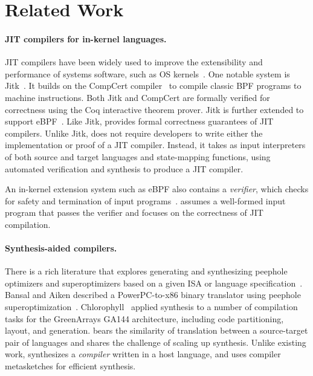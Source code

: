 \section{Related Work}\label{jitsynth:s:related}


\paragraph{JIT compilers for in-kernel languages.}

JIT compilers have been widely used to improve
the extensibility and performance of systems software,
such as OS kernels~\cite{chen:vmsec,engler:vcode,fleming:ebpf,myreen:vjit}.
%
One notable system is Jitk~\cite{wang:jitk}.
It builds on the CompCert compiler~\cite{leroy:compcert}
to compile classic BPF programs to machine instructions.
%
Both Jitk and CompCert are formally verified for correctness
using the Coq interactive theorem prover.  Jitk is further extended
to support eBPF~\cite{sobel:ejitk}.
%
Like Jitk,
\jitsynth provides formal correctness guarantees
of JIT compilers.
Unlike Jitk,
\jitsynth does not require developers to write either the implementation or proof
of a JIT compiler.
Instead,
it takes as input interpreters of both source and target languages
and state-mapping functions,
using automated verification and synthesis to produce a JIT compiler.

An in-kernel extension system such as eBPF
also contains a \emph{verifier},
which checks for safety and termination of input programs~\cite{gershuni:crab-ebpf,wang:jitk}.
\jitsynth assumes a well-formed input program that passes the verifier
and focuses on the correctness of JIT compilation.

\paragraph{Synthesis-aided compilers.}

There is a rich literature that explores generating and synthesizing
peephole optimizers and superoptimizers based on a given ISA or language
specification~\cite{bansal:superopt,davidson:peephole,gulwani:brahma,joshi:denali,massalin:superopt,sasnauskas:souper,schkufza:stoke}.
%
Bansal and Aiken described a PowerPC-to-x86 binary translator using
peephole superoptimization~\cite{bansal:binary}.
%
Chlorophyll~\cite{phothilimthana:chlorophyll} applied synthesis
to a number of compilation tasks for the GreenArrays GA144 architecture,
including code partitioning, layout, and generation.
%
\jitsynth bears the similarity of translation between a source-target pair
of languages and shares the challenge of scaling up synthesis.
%
Unlike existing work,
\jitsynth synthesizes a \emph{compiler} written in a host language,
and uses compiler metasketches for efficient synthesis.

